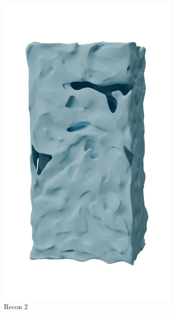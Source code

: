 \begin{figure}[htb]
\begin{subfigure}{0.19\textwidth}
            \includegraphics[width=\linewidth]{figures/inr_cabinet/cabi_inr8.png}
            \caption{Recon 2}
        \end{subfigure}
        \hfill
        \begin{subfigure}{0.19\textwidth}

\end{subfigure}
\end{figure}
